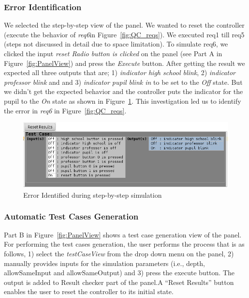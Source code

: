 \subsubsection{Error Identification}
We selected the step-by-step view of the panel. We wanted to reset the
controller (execute the behavior of \emph{req6}in Figure~\ref{fig:QC_reqs}).
We executed req1 till req5 (steps not discussed in detail due to space limitation).
To simulate req6, we clicked the input
\textsf{\emph{reset Radio button is clicked}} on the panel (see \textsf{Part A}
in Figure~\ref{fig:PanelView}) and press the \emph{Execute} button. After
getting the result we expected all three outputs that are; 1) \emph{
indicator high school blink}, 2) \emph{indicator professor blink} and and 3)
\emph{indicator pupil blink in} to be set to the \emph{Off} state. But we
didn't get the expected behavior and the controller puts the indicator for the
pupil to the \emph{On} state as shown in Figure~\ref{fig:simError}. This
investigation led us to identify the error in \emph{req6} in
Figure~\ref{fig:QC_reqs}.
\begin{figure}[!h]
\centering
\includegraphics[width=.9\textwidth]{./images/Simulation_Error.png}
\caption{Error Identified during step-by-step simulation}
\label{fig:simError}
\vspace{-.6cm}
\end{figure}
\subsubsection{Automatic Test Cases Generation} 
\vspace{-.5cm}
\textsf{Part B} in Figure~\ref{fig:PanelView} shows a
test case generation view of the panel. For performing the test cases
generation, the user performs the process that is as follows, 1) select the
\textsf{\emph{testCaseView}} from the drop down menu on the panel, 2)
manually provides inputs for the simulation parameters (i.e., depth, allowSameInput and allowSameOutput) and 3) press the execute button. The output
is added to \textsf{Result checker} part of the panel.A \textsf{“Reset Results”} button enables the user to reset the controller to its initial state.
